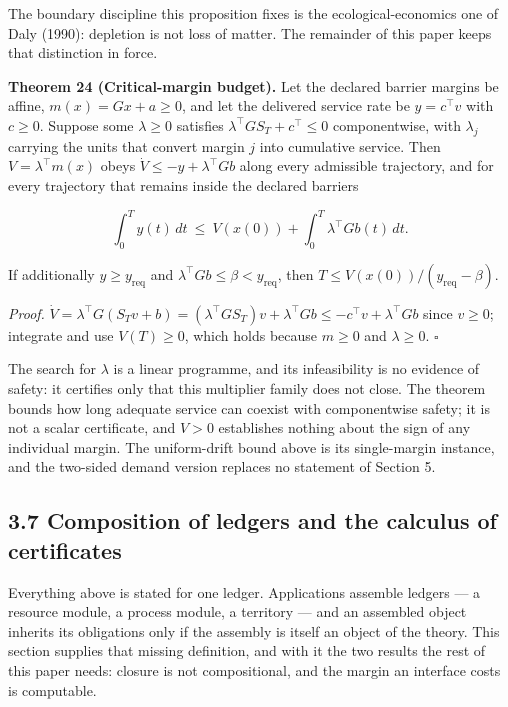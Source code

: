 \documentclass[11pt]{article}
\begin{document}
The boundary discipline this proposition fixes is the ecological-economics one of Daly (1990): depletion is not loss of matter. The remainder of this paper keeps that distinction in force.

\textbf{Theorem 24 (Critical-margin budget).} Let the declared barrier margins be affine, \(m(x)=Gx+a\ge0\), and let the delivered service rate be \(y=c^{\top}v\) with \(c\ge0\). Suppose some \(\lambda\ge0\) satisfies \(\lambda^{\top}GS_T+\allowbreak{}c^{\top}\le0\) componentwise, with \(\lambda_j\) carrying the units that convert margin \(j\) into cumulative service. Then \(V=\lambda^{\top}m(x)\) obeys \(\dot V\le-y+\lambda^{\top}Gb\) along every admissible trajectory, and for every trajectory that remains inside the declared barriers 

$$\int_0^Ty(t)\,dt\ \le\ V(x(0))+\int_0^T\lambda^{\top}Gb(t)\,dt .$$

 If additionally \(y\ge y_{\mathrm{req}}\) and \(\lambda^{\top}Gb\le\beta<y_{\mathrm{req}}\), then \(T\le V(x(0))/(y_{\mathrm{req}}-\beta)\).

\emph{Proof.} \(\dot V=\allowbreak{}\lambda^{\top}G(S_Tv+\allowbreak{}b)=\allowbreak{}(\lambda^{\top}GS_T)v+\allowbreak{}\lambda^{\top}Gb\le -c^{\top}v+\allowbreak{}\lambda^{\top}Gb\) since \(v\ge0\); integrate and use \(V(T)\ge0\), which holds because \(m\ge0\) and \(\lambda\ge0\). \(\square\)

The search for \(\lambda\) is a linear programme, and its infeasibility is no evidence of safety: it certifies only that this multiplier family does not close. The theorem bounds how long adequate service can coexist with componentwise safety; it is not a scalar certificate, and \(V>0\) establishes nothing about the sign of any individual margin. The uniform-drift bound above is its single-margin instance, and the two-sided demand version replaces no statement of Section 5.

\vspace{0.8em}

\subsection*{3.7 Composition of ledgers and the calculus of certificates}\label{37-composition-of-ledgers-and-the-calculus-of-certificates}

Everything above is stated for one ledger. Applications assemble ledgers --- a resource module, a process module, a territory --- and an assembled object inherits its obligations only if the assembly is itself an object of the theory. This section supplies that missing definition, and with it the two results the rest of this paper needs: closure is not compositional, and the margin an interface costs is computable.
\end{document}

